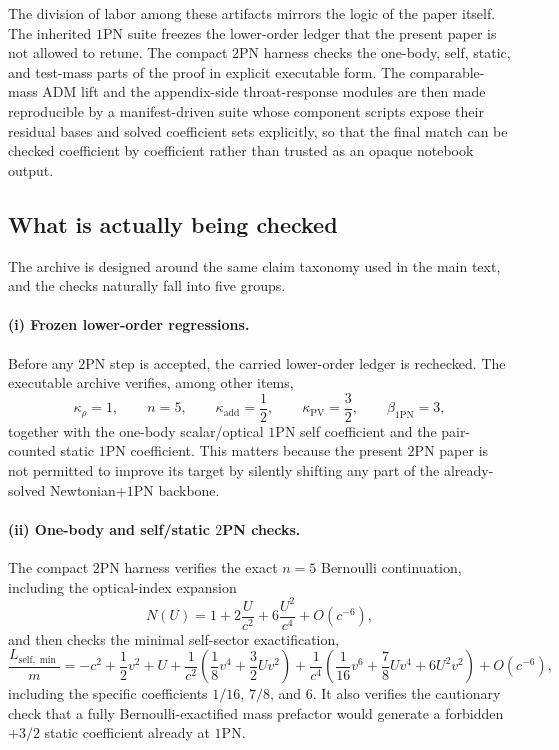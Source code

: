 \documentclass[11pt]{article}
\newcommand{\OnePN}{\mathrm{1PN}}
\newcommand{\TwoPN}{\mathrm{2PN}}
\newcommand{\ADM}{\mathrm{ADM}}
\newcommand{\kadd}{\kappa_{\mathrm{add}}}
\newcommand{\kPV}{\kappa_{\mathrm{PV}}}
\newcommand{\krho}{\kappa_{\rho}}
\begin{document}
The division of labor among these artifacts mirrors the logic of the paper itself.
The inherited \(\OnePN\) suite freezes the lower-order ledger that the present paper is
not allowed to retune.
The compact \(\TwoPN\) harness checks the one-body, self, static, and test-mass parts of
the proof in explicit executable form.
The comparable-mass \(\ADM\) lift and the appendix-side throat-response modules are then
made reproducible by a manifest-driven suite whose component scripts expose their residual
bases and solved coefficient sets explicitly, so that the final match can be checked
coefficient by coefficient rather than trusted as an opaque notebook output.

\subsection{What is actually being checked}
\label{sec:verification-checked}

The archive is designed around the same claim taxonomy used in the main text, and the
checks naturally fall into five groups.

\paragraph{(i) Frozen lower-order regressions.}
Before any \(\TwoPN\) step is accepted, the carried lower-order ledger is rechecked.
The executable archive verifies, among other items,
\begin{equation}
\krho=1,
\qquad
n=5,
\qquad
\kadd=\frac12,
\qquad
\kPV=\frac32,
\qquad
\beta_{\OnePN}=3,
\label{eq:verification-frozen-ledger}
\end{equation}
together with the one-body scalar/optical \(\OnePN\) self coefficient and the pair-counted
static \(\OnePN\) coefficient.  This matters because the present \(\TwoPN\) paper is not
permitted to improve its target by silently shifting any part of the already-solved
Newtonian+\(\OnePN\) backbone.

\paragraph{(ii) One-body and self/static \texorpdfstring{$2$}{2}PN checks.}
The compact \(\TwoPN\) harness verifies the exact \(n=5\) Bernoulli continuation,
including the optical-index expansion
\begin{equation}
N(U)=1+2\frac{U}{c^2}+6\frac{U^2}{c^4}+O(c^{-6}),
\label{eq:verification-bernoulli-index}
\end{equation}
and then checks the minimal self-sector exactification,
\begin{equation}
\frac{L_{\mathrm{self},\min}}{m}
=-c^2+\frac12 v^2+U
+\frac{1}{c^2}\left(\frac18 v^4+\frac32 Uv^2\right)
+\frac{1}{c^4}\left(\frac1{16}v^6+\frac78 Uv^4+6U^2v^2\right)+O(c^{-6}),
\label{eq:verification-self-minimal}
\end{equation}
including the specific coefficients \(1/16\), \(7/8\), and \(6\).
It also verifies the cautionary check that a fully Bernoulli-exactified mass prefactor
would generate a forbidden \(+3/2\) static coefficient already at \(\OnePN\).
\end{document}
